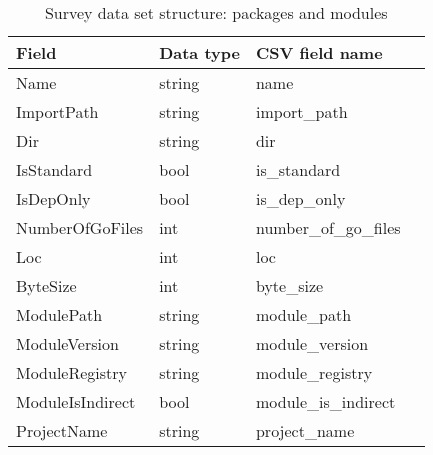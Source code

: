\begin{table}[h]
    \centering
    \caption{Survey data set structure: packages and modules}
    \label{tbl:datastructure-packages-modules}
    \begin{tabular}{llll}
        \toprule
        Field & Data type & CSV field name \\
        \midrule
        Name               & string   & name \\
        ImportPath         & string   & import\_path \\
        Dir                & string   & dir \\
        IsStandard         & bool     & is\_standard \\
        IsDepOnly          & bool     & is\_dep\_only \\
        NumberOfGoFiles    & int      & number\_of\_go\_files \\
        Loc                & int      & loc \\
        ByteSize           & int      & byte\_size \\
        ModulePath         & string   & module\_path \\
        ModuleVersion      & string   & module\_version \\
        ModuleRegistry     & string   & module\_registry \\
        ModuleIsIndirect   & bool     & module\_is\_indirect \\
        ProjectName        & string   & project\_name \\
        \bottomrule
    \end{tabular}
\end{table}

